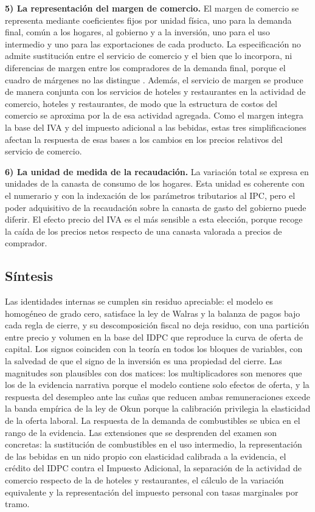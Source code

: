 \documentclass[11pt]{article}
\begin{document}
\textbf{5) La representación del margen de comercio.} El margen de comercio se representa mediante coeficientes fijos por unidad física, uno para la demanda final, común a los hogares, al gobierno y a la inversión, uno para el uso intermedio y uno para las exportaciones de cada producto. La especificación no admite sustitución entre el servicio de comercio y el bien que lo incorpora, ni diferencias de margen entre los compradores de la demanda final, porque el cuadro de márgenes no las distingue \cite{bcch_cou_2023}. Además, el servicio de margen se produce de manera conjunta con los servicios de hoteles y restaurantes en la actividad de comercio, hoteles y restaurantes, de modo que la estructura de costos del comercio se aproxima por la de esa actividad agregada. Como el margen integra la base del IVA y del impuesto adicional a las bebidas, estas tres simplificaciones afectan la respuesta de esas bases a los cambios en los precios relativos del servicio de comercio.

\textbf{6) La unidad de medida de la recaudación.} La variación total se expresa en unidades de la canasta de consumo de los hogares. Esta unidad es coherente con el numerario y con la indexación de los parámetros tributarios al IPC, pero el poder adquisitivo de la recaudación sobre la canasta de gasto del gobierno puede diferir. El efecto precio del IVA es el más sensible a esta elección, porque recoge la caída de los precios netos respecto de una canasta valorada a precios de comprador.

\subsection{Síntesis}

Las identidades internas se cumplen sin residuo apreciable: el modelo es homogéneo de grado cero, satisface la ley de Walras y la balanza de pagos bajo cada regla de cierre, y su descomposición fiscal no deja residuo, con una partición entre precio y volumen en la base del IDPC que reproduce la curva de oferta de capital. Los signos coinciden con la teoría en todos los bloques de variables, con la salvedad de que el signo de la inversión es una propiedad del cierre. Las magnitudes son plausibles con dos matices: los multiplicadores son menores que los de la evidencia narrativa porque el modelo contiene solo efectos de oferta, y la respuesta del desempleo ante las cuñas que reducen ambas remuneraciones excede la banda empírica de la ley de Okun porque la calibración privilegia la elasticidad de la oferta laboral. La respuesta de la demanda de combustibles se ubica en el rango de la evidencia. Las extensiones que se desprenden del examen son concretas: la sustitución de combustibles en el uso intermedio, la representación de las bebidas en un nido propio con elasticidad calibrada a la evidencia, el crédito del IDPC contra el Impuesto Adicional, la separación de la actividad de comercio respecto de la de hoteles y restaurantes, el cálculo de la variación equivalente y la representación del impuesto personal con tasas marginales por tramo.
\end{document}
